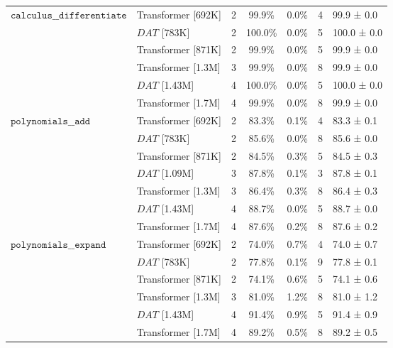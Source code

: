 \begin{tabular}{l|l|cc}
 & Transformer [692K] & 2 &                   99.9\% & 0.0\% &     4 &   99.9 ± 0.0 \\
                                 & $DAT$ [783K] & 2 &                  100.0\% & 0.0\% &     5 &  100.0 ± 0.0 \\
                                 & Transformer [871K] & 2 &                   99.9\% & 0.0\% &     5 &   99.9 ± 0.0 \\
                                 & Transformer [1.3M] & 3 &                   99.9\% & 0.0\% &     8 &   99.9 ± 0.0 \\
                                 & $DAT$ [1.43M] & 4 &                  100.0\% & 0.0\% &     5 &  100.0 ± 0.0 \\
                                 & Transformer [1.7M] & 4 &                   99.9\% & 0.0\% &     8 &   99.9 ± 0.0 \\
 & Transformer [692K] & 2 &                   83.3\% & 0.1\% &     4 &   83.3 ± 0.1 \\
                                 & $DAT$ [783K] & 2 &                   85.6\% & 0.0\% &     8 &   85.6 ± 0.0 \\
                                 & Transformer [871K] & 2 &                   84.5\% & 0.3\% &     5 &   84.5 ± 0.3 \\
                                 & $DAT$ [1.09M] & 3 &                   87.8\% & 0.1\% &     3 &   87.8 ± 0.1 \\
                                 & Transformer [1.3M] & 3 &                   86.4\% & 0.3\% &     8 &   86.4 ± 0.3 \\
                                 & $DAT$ [1.43M] & 4 &                   88.7\% & 0.0\% &     5 &   88.7 ± 0.0 \\
                                 & Transformer [1.7M] & 4 &                   87.6\% & 0.2\% &     8 &   87.6 ± 0.2 \\
 & Transformer [692K] & 2 &                   74.0\% & 0.7\% &     4 &   74.0 ± 0.7 \\
                                 & $DAT$ [783K] & 2 &                   77.8\% & 0.1\% &     9 &   77.8 ± 0.1 \\
                                 & Transformer [871K] & 2 &                   74.1\% & 0.6\% &     5 &   74.1 ± 0.6 \\
                                 & Transformer [1.3M] & 3 &                   81.0\% & 1.2\% &     8 &   81.0 ± 1.2 \\
                                 & $DAT$ [1.43M] & 4 &                   91.4\% & 0.9\% &     5 &   91.4 ± 0.9 \\
                                 & Transformer [1.7M] & 4 &                   89.2\% & 0.5\% &     8 &   89.2 ± 0.5 \\
\bottomrule
\end{tabular}

